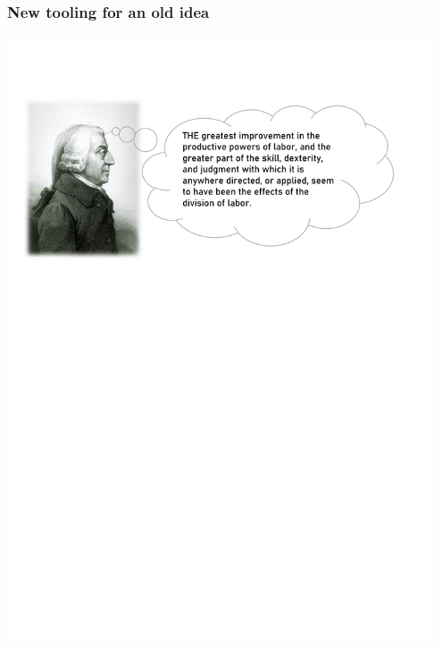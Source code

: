 \begin{frame}\frametitle{New tooling for an old idea}

\centering
\includegraphics[width=0.95\textwidth]{material/crop-adam-smith.pdf}\\

\end{frame}

